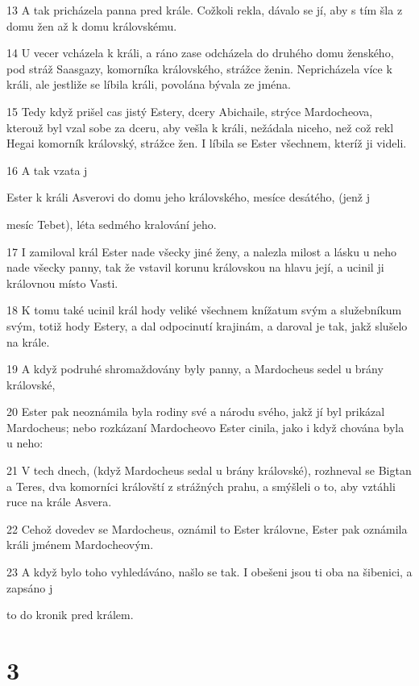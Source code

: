 \par 13 A tak pricházela panna pred krále. Cožkoli rekla, dávalo se jí, aby s tím šla z domu žen až k domu královskému.
\par 14 U vecer vcházela k králi, a ráno zase odcházela do druhého domu ženského, pod stráž Saasgazy, komorníka královského, strážce ženin. Nepricházela více k králi, ale jestliže se líbila králi, povolána bývala ze jména.
\par 15 Tedy když prišel cas jistý Estery, dcery Abichaile, strýce Mardocheova, kterouž byl vzal sobe za dceru, aby vešla k králi, nežádala niceho, než což rekl Hegai komorník královský, strážce žen. I líbila se Ester všechnem, kteríž ji videli.
\par 16 A tak vzata j\par Ester k králi Asverovi do domu jeho královského, mesíce desátého, (jenž j\par mesíc Tebet), léta sedmého kralování jeho.
\par 17 I zamiloval král Ester nade všecky jiné ženy, a nalezla milost a lásku u neho nade všecky panny, tak že vstavil korunu královskou na hlavu její, a ucinil ji královnou místo Vasti.
\par 18 K tomu také ucinil král hody veliké všechnem knížatum svým a služebníkum svým, totiž hody Estery, a dal odpocinutí krajinám, a daroval je tak, jakž slušelo na krále.
\par 19 A když podruhé shromaždovány byly panny, a Mardocheus sedel u brány královské,
\par 20 Ester pak neoznámila byla rodiny své a národu svého, jakž jí byl prikázal Mardocheus; nebo rozkázaní Mardocheovo Ester cinila, jako i když chována byla u neho:
\par 21 V tech dnech, (když Mardocheus sedal u brány královské), rozhneval se Bigtan a Teres, dva komorníci královští z strážných prahu, a smýšleli o to, aby vztáhli ruce na krále Asvera.
\par 22 Cehož dovedev se Mardocheus, oznámil to Ester královne, Ester pak oznámila králi jménem Mardocheovým.
\par 23 A když bylo toho vyhledáváno, našlo se tak. I obešeni jsou ti oba na šibenici, a zapsáno j\par to do kronik pred králem.

\chapter{3}

